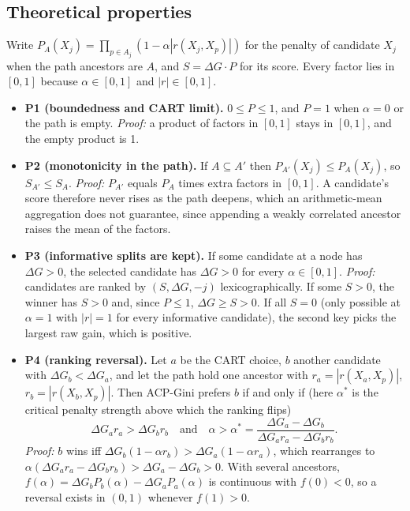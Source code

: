 \documentclass[pdflatex,sn-basic,Numbered]{sn-jnl}
\begin{document}
\subsection{Theoretical properties}\label{subsec:theory}
Write $P_A(X_j)=\prod_{p\in A_j}(1-\alpha|r(X_j,X_p)|)$ for the penalty of candidate $X_j$ when the path ancestors are $A$, and $S=\Delta G\cdot P$ for its score. Every factor lies in $[0,1]$ because $\alpha\in[0,1]$ and $|r|\in[0,1]$.

\begin{itemize}
\item \textbf{P1 (boundedness and CART limit).} $0\le P\le1$, and $P=1$ when $\alpha=0$ or the path is empty. \emph{Proof:} a product of factors in $[0,1]$ stays in $[0,1]$, and the empty product is 1.
\item \textbf{P2 (monotonicity in the path).} If $A\subseteq A'$ then $P_{A'}(X_j)\le P_A(X_j)$, so $S_{A'}\le S_A$. \emph{Proof:} $P_{A'}$ equals $P_A$ times extra factors in $[0,1]$. A candidate's score therefore never rises as the path deepens, which an arithmetic-mean aggregation does not guarantee, since appending a weakly correlated ancestor raises the mean of the factors.
\item \textbf{P3 (informative splits are kept).} If some candidate at a node has $\Delta G>0$, the selected candidate has $\Delta G>0$ for every $\alpha\in[0,1]$. \emph{Proof:} candidates are ranked by $(S,\Delta G,-j)$ lexicographically. If some $S>0$, the winner has $S>0$ and, since $P\le1$, $\Delta G\ge S>0$. If all $S=0$ (only possible at $\alpha=1$ with $|r|=1$ for every informative candidate), the second key picks the largest raw gain, which is positive.
\item \textbf{P4 (ranking reversal).} Let $a$ be the CART choice, $b$ another candidate with $\Delta G_b<\Delta G_a$, and let the path hold one ancestor with $r_a=|r(X_a,X_p)|$, $r_b=|r(X_b,X_p)|$. Then ACP-Gini prefers $b$ if and only if (here $\alpha^*$ is the critical penalty strength above which the ranking flips)
\[
\Delta G_a r_a>\Delta G_b r_b\quad\text{and}\quad \alpha>\alpha^*=\frac{\Delta G_a-\Delta G_b}{\Delta G_a r_a-\Delta G_b r_b}.
\]
\emph{Proof:} $b$ wins iff $\Delta G_b(1-\alpha r_b)>\Delta G_a(1-\alpha r_a)$, which rearranges to $\alpha(\Delta G_a r_a-\Delta G_b r_b)>\Delta G_a-\Delta G_b>0$. With several ancestors, $f(\alpha)=\Delta G_bP_b(\alpha)-\Delta G_aP_a(\alpha)$ is continuous with $f(0)<0$, so a reversal exists in $(0,1)$ whenever $f(1)>0$.
\end{itemize}
\end{document}
